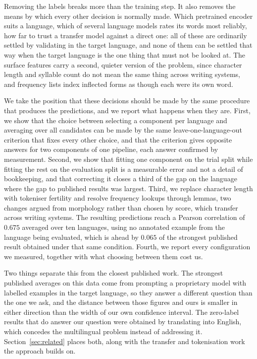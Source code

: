 Removing the labels breaks more than the training step. It also removes
the means by which every other decision is normally made. Which
pretrained encoder suits a language, which of several language models
rates its words most reliably, how far to trust a transfer model against
a direct one: all of these are ordinarily settled by validating in the
target language, and none of them can be settled that way when the
target language is the one thing that must not be looked at. The surface
features carry a second, quieter version of the problem, since character
length and syllable count do not mean the same thing across writing
systems, and frequency lists index inflected forms as though each were
its own word.

We take the position that these decisions should be made by the same
procedure that produces the predictions, and we report what happens when
they are. First, we show that the choice between selecting a component
per language and averaging over all candidates can be made by the same
leave-one-language-out criterion that fixes every other choice, and that
the criterion gives opposite answers for two components of one pipeline,
each answer confirmed by measurement. Second, we show that fitting one
component on the trial split while fitting the rest on the evaluation
split is a measurable error and not a detail of bookkeeping, and that
correcting it closes a third of the gap on the language where the gap to
published results was largest. Third, we replace character length with
tokeniser fertility and resolve frequency lookups through lemmas, two
changes argued from morphology rather than chosen by score, which
transfer across writing systems. The resulting predictions reach a
Pearson correlation of $0.675$ averaged over ten languages, using no annotated
example from the language being evaluated, which is ahead by $0.065$ of
the strongest published result obtained under that same condition.
Fourth, we report every configuration we measured, together with what
choosing between them cost us.

Two things separate this from the closest published work. The strongest
published averages on this data come from prompting a proprietary model
with labelled examples in the target language, so they answer a
different question than the one we ask, and the distance between those
figures and ours is smaller in either direction than the width of our
own confidence interval.
The zero-label results that do answer our question were obtained by
translating into English, which concedes the multilingual problem
instead of addressing it. Section~\ref{sec:related} places both, along
with the transfer and tokenisation work the approach builds on.

